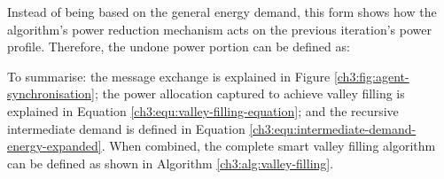 

Instead of being based on the general energy demand, this form shows how the algorithm's power reduction mechanism acts on the previous iteration's power profile.
Therefore, the undone power portion can be defined as:



To summarise: the message exchange is explained in Figure \ref{ch3:fig:agent-synchronisation}; the power allocation captured to achieve valley filling is explained in Equation \ref{ch3:equ:valley-filling-equation}; and the recursive intermediate demand is defined in Equation \ref{ch3:equ:intermediate-demand-energy-expanded}.
When combined, the complete smart valley filling algorithm can be defined as shown in Algorithm \ref{ch3:alg:valley-filling}.















